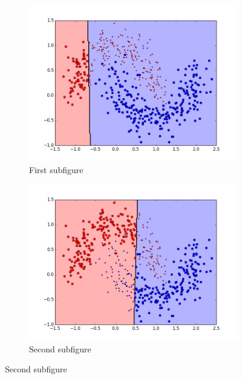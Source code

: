 \begin{figure}[t!] %
\begin{subfigure}{0.48\textwidth}
\includegraphics[width=\linewidth]{figs/Banana/2All-Classifiers}
\caption{First subfigure} %
\label{fig:Banana_all_single_a}
\end{subfigure}\hspace*{\fill}
\begin{subfigure}{0.48\textwidth}
\includegraphics[width=\linewidth]{figs/Banana/12All-Classifiers}
\caption{Second subfigure} \label{fig:Banana_all_single_b}
\end{subfigure}


\end{figure}
